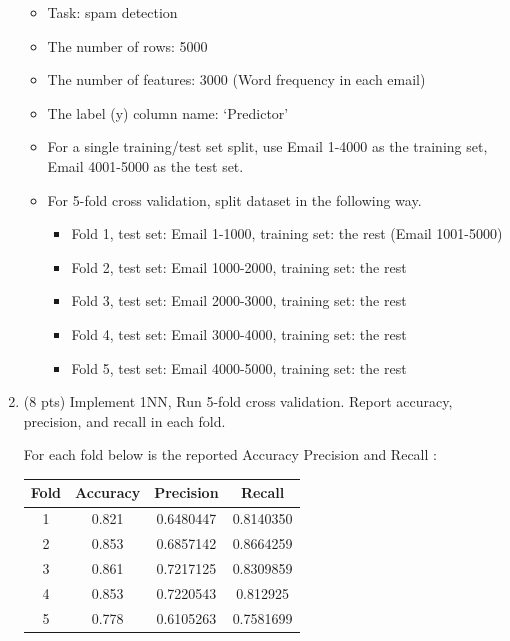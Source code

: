 \documentclass[a4paper]{article}
\theoremstyle{definition}
\newenvironment{soln}{
    \leavevmode\color{blue}\ignorespaces
}{}
\begin{document}
\begin{enumerate}
	\begin{itemize}
		\item Task: spam detection
		\item The number of rows: 5000
		\item The number of features: 3000 (Word frequency in each email)
		\item The label (y) column name: `Predictor'
		\item For a single training/test set split, use Email 1-4000 as the training set, Email 4001-5000 as the test set.
		\item For 5-fold cross validation, split dataset in the following way.
		\begin{itemize}
			\item Fold 1, test set: Email 1-1000, training set: the rest (Email 1001-5000)
			\item Fold 2, test set: Email 1000-2000, training set: the rest
			\item Fold 3, test set: Email 2000-3000, training set: the rest
			\item Fold 4, test set: Email 3000-4000, training set: the rest
			\item Fold 5, test set: Email 4000-5000, training set: the rest			
		\end{itemize}
	\end{itemize}
	
	\item (8 pts) Implement 1NN, Run 5-fold cross validation. Report accuracy, precision, and recall in each fold.
	
	\begin{soln}  For each fold below is the reported Accuracy                     Precision and Recall : \\
            \begin{center}
            \begin{tabular}{ c  c  c  c}
            \hline
            Fold & Accuracy & Precision & Recall \\ \hline
            1 & 0.821 & 0.6480447 & 0.8140350 \\
            2 & 0.853 & 0.6857142 & 0.8664259 \\
            3 & 0.861 & 0.7217125 & 0.8309859 \\
            4 & 0.853 & 0.7220543 & 0.812925\\
            5 & 0.778 & 0.6105263 & 0.7581699 \\
            \hline
            \end{tabular}
            \end{center}
 

\end{soln}
\end{enumerate}
\end{document}
